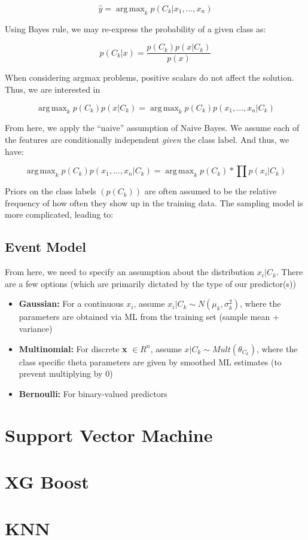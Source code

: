 \documentclass{article}
\DeclareMathOperator*{\argmax}{arg\,max}
\begin{document}
\begin{equation*}
	\hat{y} = \argmax_k p(C_k | x_1, \ldots, x_n)
\end{equation*}

Using Bayes rule, we may re-express the probability of a given class as:

\begin{equation*}
	p(C_k | x) = \frac{p(C_k) p(x | C_k)}{p(x)}
\end{equation*}

When considering argmax problems, positive scalars do not affect the solution. Thus, we are interested in

\begin{equation*}
	\argmax_k p(C_k) p(x | C_k) = 	\argmax_k p(C_k) p(x_1, \ldots, x_n | C_k)
\end{equation*}

From here, we apply the ``naive'' assumption of Naive Bayes. We assume each of the features are conditionally independent \textit{given} the class label. And thus, we have:

\begin{equation*}
	\argmax_k p(C_k) p(x_1, \ldots, x_n | C_k) = \argmax_k p(C_k) * \prod p(x_i | C_k)
\end{equation*}

Priors on the class labels $(p(C_k))$ are often assumed to be the relative frequency of how often they show up in the training data. The sampling model is more complicated, leading to:

\subsection{Event Model}

From here, we need to specify an assumption about the distribution $x_i | C_k$. There are a few options (which are primarily dictated by the type of our predictor(s))

\begin{itemize}
	\item \textbf{Gaussian:} For a continuous $x_i$, assume $x_i | C_k \sim N(\mu_k, \sigma_k^2)$, where the parameters are obtained via ML from the training set (sample mean + variance)
	\item \textbf{Multinomial:} For discrete \textbf{x} $\in R^n$, assume $x | C_k \sim Mult(\theta_{C_k})$, where the class specific theta parameters are given by smoothed ML estimates (to prevent multiplying by 0)
	\item \textbf{Bernoulli:} For binary-valued predictors
\end{itemize}


\section{Support Vector Machine}

\section{XG Boost}

\section{KNN}
\end{document}

